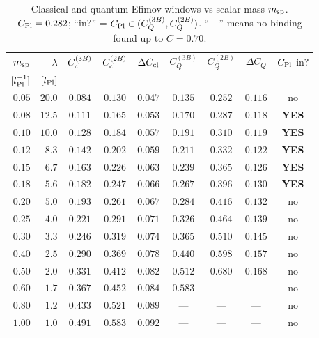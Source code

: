 \begin{table}[h]
\centering
\caption{Classical and quantum Efimov windows vs scalar mass $m_{\rm sp}$.
$C_{\rm Pl}=0.282$; ``in?'' = $C_{\rm Pl}\in(C_Q^{(3B)},C_Q^{(2B)})$.
``---'' means no binding found up to $C=0.70$.}
\label{tab:qm_window_msp}
\begin{tabular}{rr|ccc|ccc|c}
\hline
$m_{\rm sp}$ & $\lambda$ &
$C_{\rm cl}^{(3B)}$ & $C_{\rm cl}^{(2B)}$ & $\Delta C_{\rm cl}$ &
$C_Q^{(3B)}$ & $C_Q^{(2B)}$ & $\Delta C_Q$ &
$C_{\rm Pl}$ in? \\
$[l_{\rm Pl}^{-1}]$ & $[l_{\rm Pl}]$ & & & & & & & \\
\hline
$0.05$ & $20.0$ & $0.084$ & $0.130$ & $0.047$ & $0.135$ & $0.252$ & $0.116$ & no \\
$0.08$ & $12.5$ & $0.111$ & $0.165$ & $0.053$ & $0.170$ & $0.287$ & $0.118$ & \textbf{YES} \\
$0.10$ & $10.0$ & $0.128$ & $0.184$ & $0.057$ & $0.191$ & $0.310$ & $0.119$ & \textbf{YES} \\
$0.12$ & $ 8.3$ & $0.142$ & $0.202$ & $0.059$ & $0.211$ & $0.332$ & $0.122$ & \textbf{YES} \\
$0.15$ & $ 6.7$ & $0.163$ & $0.226$ & $0.063$ & $0.239$ & $0.365$ & $0.126$ & \textbf{YES} \\
$0.18$ & $ 5.6$ & $0.182$ & $0.247$ & $0.066$ & $0.267$ & $0.396$ & $0.130$ & \textbf{YES} \\
$0.20$ & $ 5.0$ & $0.193$ & $0.261$ & $0.067$ & $0.284$ & $0.416$ & $0.132$ & no \\
$0.25$ & $ 4.0$ & $0.221$ & $0.291$ & $0.071$ & $0.326$ & $0.464$ & $0.139$ & no \\
$0.30$ & $ 3.3$ & $0.246$ & $0.319$ & $0.074$ & $0.365$ & $0.510$ & $0.145$ & no \\
$0.40$ & $ 2.5$ & $0.290$ & $0.369$ & $0.078$ & $0.440$ & $0.598$ & $0.157$ & no \\
$0.50$ & $ 2.0$ & $0.331$ & $0.412$ & $0.082$ & $0.512$ & $0.680$ & $0.168$ & no \\
$0.60$ & $ 1.7$ & $0.367$ & $0.452$ & $0.084$ & $0.583$ & ---     & ---     & no \\
$0.80$ & $ 1.2$ & $0.433$ & $0.521$ & $0.089$ & ---     & ---     & ---     & no \\
$1.00$ & $ 1.0$ & $0.491$ & $0.583$ & $0.092$ & ---     & ---     & ---     & no \\
\hline
\end{tabular}
\end{table}

